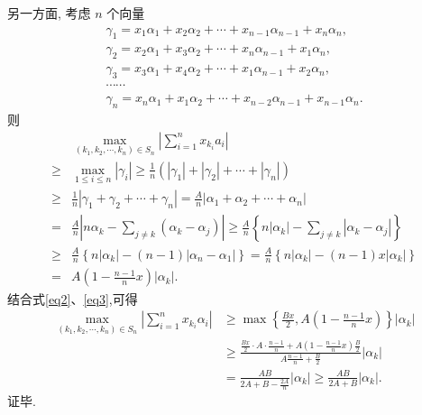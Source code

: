 另一方面, 考虑 $n$ 个向量
$$
\begin{gathered}
\gamma_1=x_1 \alpha_1+x_2 \alpha_2+\cdots+x_{n-1} \alpha_{n-1}+x_n \alpha_n, \\
\gamma_2=x_2 \alpha_1+x_3 \alpha_2+\cdots+x_n \alpha_{n-1}+x_1 \alpha_n, \\
\gamma_3=x_3 \alpha_1+x_4 \alpha_2+\cdots+x_1 \alpha_{n-1}+x_2 \alpha_n, \\
\cdots \cdots \\
\gamma_n=x_n \alpha_1+x_1 \alpha_2+\cdots+x_{n-2} \alpha_{n-1}+x_{n-1} \alpha_n .
\end{gathered}
$$
则
$$
\begin{aligned}
& \max _{\left(k_1, k_2, \cdots, k_n\right) \in S_n}\left|\sum_{i=1}^n x_{k_i} a_i\right| \\
\geqslant & \max _{1 \leqslant i \leqslant n}\left|\gamma_i\right| \geqslant \frac{1}{n}\left(\left|\gamma_1\right|+\left|\gamma_2\right|+\cdots+\left|\gamma_n\right|\right) \\
\geqslant & \frac{1}{n}\left|\gamma_1+\gamma_2+\cdots+\gamma_n\right|=\frac{A}{n}\left|\alpha_1+\alpha_2+\cdots+\alpha_n\right| \\
= & \frac{A}{n}\left|n \alpha_k-\sum_{j \neq k}\left(\alpha_k-\alpha_j\right)\right| \geqslant \frac{A}{n}\left\{n\left|\alpha_k\right|-\sum_{j \neq k}\left|\alpha_k-\alpha_j\right|\right\} \\
\geqslant & \frac{A}{n}\left\{n\left|\alpha_k\right|-(n-1)\left|\alpha_n-\alpha_1\right|\right\}=\frac{A}{n}\left\{n\left|\alpha_k\right|-(n-1) x\left|\alpha_k\right|\right\} \\
= & A\left(1-\frac{n-1}{n} x\right)\left|\alpha_k\right| .
\end{aligned} \label{eq3}
$$
结合式\ref{eq2}、\ref{eq3},可得
$$
\begin{aligned}
\max _{\left(k_1, k_2, \cdots, k_n\right) \in S_n}\left|\sum_{i=1}^n x_{k_i} \alpha_i\right| & \geqslant \max \left\{\frac{B x}{2}, A\left(1-\frac{n-1}{n} x\right)\right\}\left|\alpha_k\right| \\
& \geqslant \frac{\frac{B x}{2} \cdot A \cdot \frac{n-1}{n}+A\left(1-\frac{n-1}{n} x\right) \frac{B}{2}}{A \frac{n-1}{n}+\frac{B}{2}}\left|\alpha_k\right| \\
& =\frac{A B}{2 A+B-\frac{2 A}{n}}\left|\alpha_k\right| \geqslant \frac{A B}{2 A+B}\left|\alpha_k\right| .
\end{aligned}
$$
证毕.



